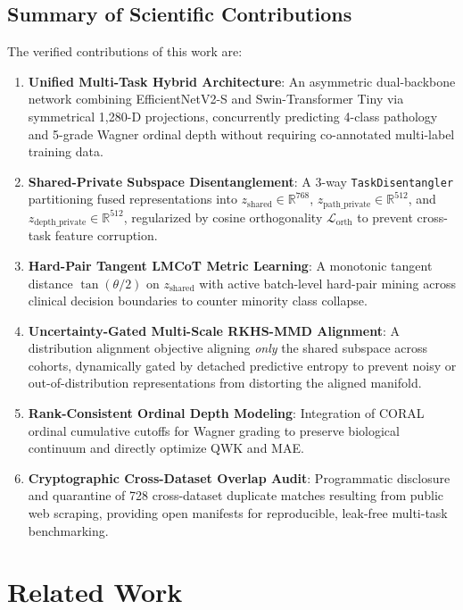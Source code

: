 \documentclass[journal]{IEEEtran}
\begin{document}
\subsection{Summary of Scientific Contributions}
The verified contributions of this work are:
\begin{enumerate}
    \item \textbf{Unified Multi-Task Hybrid Architecture}: An asymmetric dual-backbone network combining EfficientNetV2-S and Swin-Transformer Tiny via symmetrical 1,280-D projections, concurrently predicting 4-class pathology and 5-grade Wagner ordinal depth without requiring co-annotated multi-label training data.
    \item \textbf{Shared-Private Subspace Disentanglement}: A 3-way \texttt{TaskDisentangler} partitioning fused representations into $z_{\text{shared}} \in \mathbb{R}^{768}$, $z_{\text{path\_private}} \in \mathbb{R}^{512}$, and $z_{\text{depth\_private}} \in \mathbb{R}^{512}$, regularized by cosine orthogonality $\mathcal{L}_{\text{orth}}$ to prevent cross-task feature corruption.
    \item \textbf{Hard-Pair Tangent LMCoT Metric Learning}: A monotonic tangent distance $\tan(\theta/2)$ on $z_{\text{shared}}$ with active batch-level hard-pair mining across clinical decision boundaries to counter minority class collapse.
    \item \textbf{Uncertainty-Gated Multi-Scale RKHS-MMD Alignment}: A distribution alignment objective aligning \textit{only} the shared subspace across cohorts, dynamically gated by detached predictive entropy to prevent noisy or out-of-distribution representations from distorting the aligned manifold.
    \item \textbf{Rank-Consistent Ordinal Depth Modeling}: Integration of CORAL ordinal cumulative cutoffs for Wagner grading to preserve biological continuum and directly optimize QWK and MAE.
    \item \textbf{Cryptographic Cross-Dataset Overlap Audit}: Programmatic disclosure and quarantine of 728 cross-dataset duplicate matches resulting from public web scraping, providing open manifests for reproducible, leak-free multi-task benchmarking.
\end{enumerate}

\section{Related Work}
\end{document}
